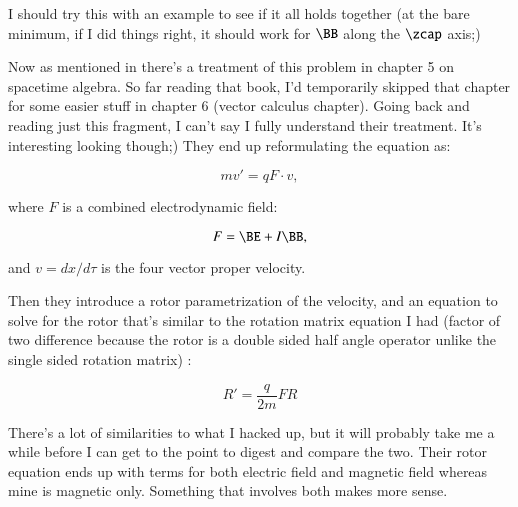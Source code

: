 I should try this with an example to see if it all holds together (at the bare minimum, if I did things right, it should work for $\BB$ along the $\zcap$ axis;)

Now as mentioned in \cite{doran2003gap} there's a treatment of this problem in chapter 5 on spacetime algebra.  So far reading that book, I'd temporarily skipped that chapter for some easier stuff in chapter 6 (vector calculus chapter).  Going back and reading just this fragment, I can't say I fully understand their treatment.  It's interesting looking though;)  They end up reformulating the equation as:

\begin{equation}\label{eqn:lorentzRotation:n}
m v' = q F \cdot v,
\end{equation}

where $F$ is a combined electrodynamic field:

\begin{equation}\label{eqn:lorentzRotation:n}
F = \BE + I \BB,
\end{equation}

and $v = dx/d\tau$ is the four vector proper velocity.

Then they introduce a rotor parametrization of the velocity, and an equation to solve for the rotor that's similar to the rotation matrix equation I had (factor of two difference because the rotor is a double sided half angle operator unlike the single sided rotation matrix) :

\begin{equation}\label{eqn:lorentzRotation:n}
R' = \frac{q}{2m} F R
\end{equation}

There's a lot of similarities to what I hacked up, but it will probably take me a while before I can get to the point to digest and compare the two.   Their rotor equation ends up with terms for both electric field and magnetic field whereas mine is magnetic only.  Something that involves both makes more sense.
